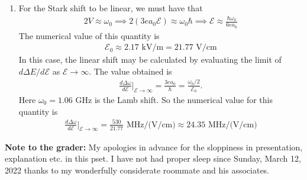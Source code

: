 \documentclass{article}
\theoremstyle{definition}
\newcommand{\f}[2]{\frac{#1}{#2}}
\begin{document}
\begin{enumerate}[label=(\alph*)]
	\item For the Stark shift to be linear, we must have that 
	\begin{align*}
	2V\approx \omega_0 \implies 2(3ea_0 \mathcal{E}) \approx \omega_0 \hbar \implies {\mathcal{E} \approx  \f{\hbar\omega_0}{6ea_0}}
	\end{align*}
	The numerical value of this quantity is 
	\begin{align*}
	\mathcal{E}_0 \approx 2.17 \text{ kV/m} = \boxed{21.77 \text{ V/cm}}
	\end{align*}
	In this case, the linear shift may be calculated by evaluating the limit of $d\Delta E/d\mathcal{E}$ as $\mathcal{E} \to \infty$. The value obtained is 
	\begin{align*}
	\f{d\Delta \omega}{d\mathcal{E}}\bigg\vert_{\mathcal{E}\to \infty} = \f{3 e a_0}{\hbar} =\f{\omega_0/2}{\mathcal{E}_0}.
	\end{align*}
	Here $\omega_0 = 1.06 \text{ GHz}$ is the Lamb shift. So the numerical value for this quantity is 
	\begin{align*}
	\f{d\Delta \omega}{d\mathcal{E}}\bigg\vert_{\mathcal{E}\to \infty} = \f{530}{21.77} \text{ MHz/(V/cm)} \approx \boxed{ 24.35 \text{ MHz/(V/cm)} }
	\end{align*}
	
	
	
\end{enumerate}

\noindent \textbf{Note to the grader:}  My apologies in advance for the sloppiness in presentation, explanation etc. in this pset. I have not had proper sleep since Sunday, March 12, 2022 thanks to my wonderfully considerate roommate and his associates. 
\end{document}
